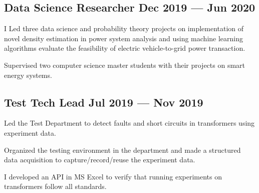 \documentclass[letter,10pt]{article}
\begin{document}
\subsection{{Data Science Researcher \hfill Dec 2019 --- Jun 2020}}
\begin{zitemize}
\item I Led three data science and probability theory projects on implementation of novel density estimation in power system analysis and using machine learning algorithms evaluate the feasibility of electric vehicle-to-grid power transaction.
\item Supervised two computer science master students with their projects on smart energy systems.
\end{zitemize}

\subsection{{Test Tech Lead \hfill Jul 2019 --- Nov 2019}}
\begin{zitemize}
\item Led the Test Department to detect faults and short circuits in transformers using experiment data.
\item Organized the testing environment in the department and made a structured data acquisition to capture/record/reuse the experiment data.
\item I developed an API in MS Excel to verify that running experiments on transformers follow all standards.
\end{zitemize}
\end{document}
